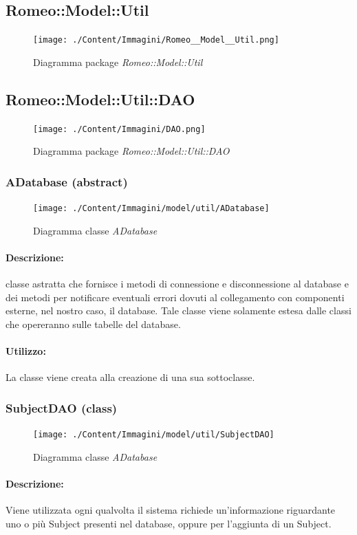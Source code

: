 \subsection{Romeo::Model::Util}
	\begin{figure} [!h]
		\centering
		\texttt{[image: ./Content/Immagini/Romeo\_\_Model\_\_Util.png]}
		\caption{Diagramma package \textsl{Romeo::Model::Util}}
	\end{figure}
\subsection{Romeo::Model::Util::DAO}
	\begin{figure} [!h]
		\centering
		\texttt{[image: ./Content/Immagini/DAO.png]}
		\caption{Diagramma package \textsl{Romeo::Model::Util::DAO}}
	\end{figure}
	\subsubsection{ADatabase (abstract)}
	\begin{figure}[!h]
		\centering
		\texttt{[image: ./Content/Immagini/model/util/ADatabase]}
		\caption{Diagramma classe \textsl{ADatabase}}
	\end{figure}
	\paragraph{Descrizione:} classe astratta che fornisce i metodi di connessione e disconnessione al database e dei metodi per notificare eventuali errori dovuti al collegamento con componenti esterne, nel nostro caso, il database. Tale classe viene solamente estesa dalle classi che opereranno sulle tabelle del database.
	\paragraph{Utilizzo:} La classe viene creata alla creazione di una sua sottoclasse.
	\subsubsection{SubjectDAO (class)}
	\begin{figure}[!h]
		\centering
		\texttt{[image: ./Content/Immagini/model/util/SubjectDAO]}
		\caption{Diagramma classe \textsl{ADatabase}}
	\end{figure}
	\paragraph{Descrizione:} Viene utilizzata ogni qualvolta il sistema richiede un'informazione riguardante uno o più Subject\g{} presenti nel database, oppure per l'aggiunta di un Subject\g{}.
